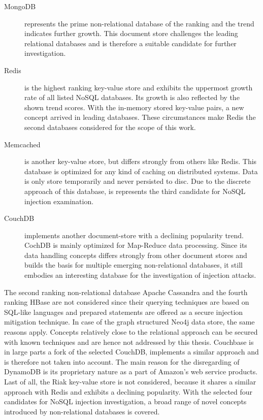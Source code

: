 \begin{description}
\item [MongoDB] represents the prime non-relational database of the ranking and the trend indicates further growth. This document store challenges the leading relational databases and is therefore a suitable candidate for further investigation. 
\item [Redis] is the highest ranking key-value store and exhibits the uppermost growth rate of all listed NoSQL databases. Its growth is also reflected by the shown trend scores. With the in-memory stored key-value pairs, a new concept arrived in leading databases. These circumstances make Redis the second databases considered for the scope of this work.
\item [Memcached] is another key-value store, but differs strongly from others like Redis. This database is optimized for any kind of caching on distributed systems. Data is only store temporarily and never persisted to disc. Due to the discrete approach of this database, is represents the third candidate for NoSQL injection examination.
\item [CouchDB] implements another document-store with a declining popularity trend. CochDB is mainly optimized for Map-Reduce data processing.  Since its data handling concepts differs strongly from other document stores and builds the basis for multiple emerging non-relational databases, it still embodies an interesting database for the investigation of injection attacks.
\end{description}

The second ranking non-relational database Apache Cassandra and the fourth ranking HBase are not considered since their querying techniques are based on SQL-like languages and prepared statements are offered as a secure injection mitigation technique. In case of the graph structured Neo4j data store, the same reasons apply. Concepts relatively close to the relational approach can be secured with known techniques and are hence not addressed by this thesis. Couchbase is in large parts a fork of the selected CouchDB, implements a similar approach and is therefore not taken into account. The main reason for the disregarding of DynamoDB is its proprietary nature as a part of Amazon's web service products. Last of all, the Riak key-value store is not considered, because it shares a similar approach with Redis and exhibits a declining popularity. With the selected four candidates for NoSQL injection investigation, a broad range of novel concepts introduced by non-relational databases is covered.


